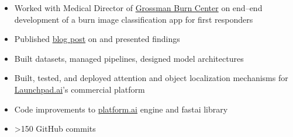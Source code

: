\documentclass[10pt,a4paper]{altacv}
\begin{document}

\begin{fullwidth}
\makecvheader
\end{fullwidth}




\begin{itemize}
\item Worked with Medical Director of 
\href{https://www.grossmanburncenter.com/}{Grossman Burn Center} on end--end development of a burn image classification app for first responders
\item Published \href{https://platform.ai/blog/page/6/classifying-burn-depth/}{blog post} on and presented findings
\item Built datasets, managed pipelines, designed model architectures
\item Built, tested, and deployed attention and object localization mechanisms for 
\href{https://launchpad.ai/}{Launchpad.ai}'s commercial platform 
\item Code improvements to 
\href{https://platform.ai/}{platform.ai} engine and fastai library
\item >150 GitHub commits
\end{itemize}
\end{document}
